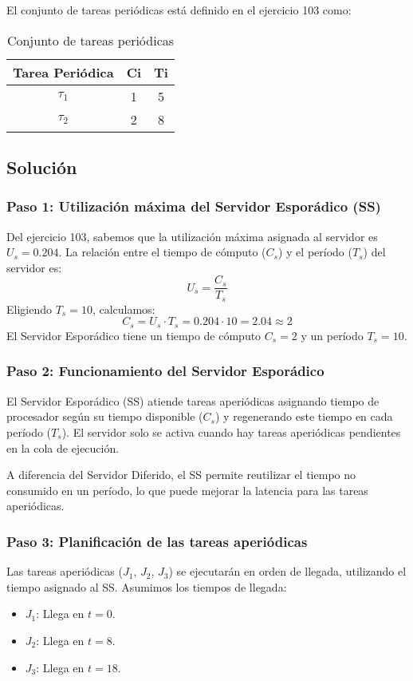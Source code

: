 \documentclass[a4paper,12pt]{article}
\begin{document}
El conjunto de tareas periódicas está definido en el ejercicio 103 como:
\begin{table}[H]
\centering
\begin{tabular}{|c|c|c|}
\hline
\textbf{Tarea Periódica} & \textbf{Ci} & \textbf{Ti} \\ \hline
$\tau_1$ & 1 & 5 \\ \hline
$\tau_2$ & 2 & 8 \\ \hline
\end{tabular}
\caption{Conjunto de tareas periódicas}
\end{table}

\subsection{Solución}
\subsubsection{Paso 1: Utilización máxima del Servidor Esporádico (SS)}
Del ejercicio 103, sabemos que la utilización máxima asignada al servidor es \(U_s = 0.204\). La relación entre el tiempo de cómputo (\(C_s\)) y el período (\(T_s\)) del servidor es:
\[
U_s = \frac{C_s}{T_s}
\]
Eligiendo \(T_s = 10\), calculamos:
\[
C_s = U_s \cdot T_s = 0.204 \cdot 10 = 2.04 \approx 2
\]
El Servidor Esporádico tiene un tiempo de cómputo \(C_s = 2\) y un período \(T_s = 10\).

\subsubsection{Paso 2: Funcionamiento del Servidor Esporádico}
El Servidor Esporádico (SS) atiende tareas aperiódicas asignando tiempo de procesador según su tiempo disponible (\(C_s\)) y regenerando este tiempo en cada período (\(T_s\)). El servidor solo se activa cuando hay tareas aperiódicas pendientes en la cola de ejecución. 

A diferencia del Servidor Diferido, el SS permite reutilizar el tiempo no consumido en un período, lo que puede mejorar la latencia para las tareas aperiódicas.

\subsubsection{Paso 3: Planificación de las tareas aperiódicas}
Las tareas aperiódicas (\(J_1\), \(J_2\), \(J_3\)) se ejecutarán en orden de llegada, utilizando el tiempo asignado al SS. Asumimos los tiempos de llegada:
\begin{itemize}
    \item \(J_1\): Llega en \(t = 0\).
    \item \(J_2\): Llega en \(t = 8\).
    \item \(J_3\): Llega en \(t = 18\).
\end{itemize}
\end{document}
